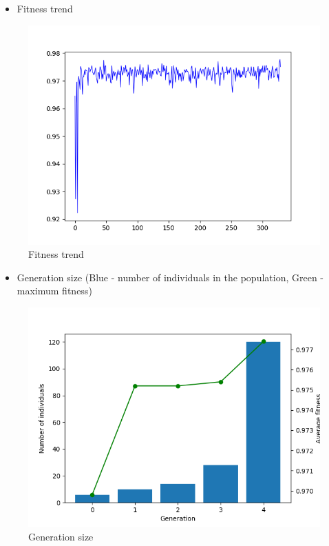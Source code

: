 \documentclass[11pt]{article}
\makeatletter
\def\maxwidth{\ifdim\Gin@nat@width>\linewidth\linewidth
    \else\Gin@nat@width\fi}
\let\Oldincludegraphics\includegraphics
\renewcommand{\includegraphics}[1]{\Oldincludegraphics[width=.8\maxwidth]{#1}}
\providecommand{\tightlist}{%
      \setlength{\itemsep}{0pt}\setlength{\parskip}{0pt}}
\makeatother
\begin{document}
\begin{itemize}
\tightlist
\item
  Fitness trend
\end{itemize}

\begin{figure}
\centering
\includegraphics{gfx/fitness-trend-tne-1.png}
\caption{Fitness trend}
\end{figure}

\begin{itemize}
\tightlist
\item
  Generation size (Blue - number of individuals in the population, Green
  - maximum fitness)
\end{itemize}

\begin{figure}
\centering
\includegraphics{gfx/generation-size-tne-1.png}
\caption{Generation size}
\end{figure}
\end{document}
